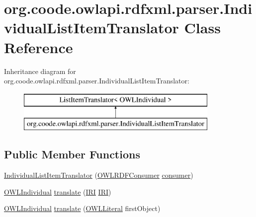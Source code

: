 \hypertarget{classorg_1_1coode_1_1owlapi_1_1rdfxml_1_1parser_1_1_individual_list_item_translator}{\section{org.\-coode.\-owlapi.\-rdfxml.\-parser.\-Individual\-List\-Item\-Translator Class Reference}
\label{classorg_1_1coode_1_1owlapi_1_1rdfxml_1_1parser_1_1_individual_list_item_translator}
}
Inheritance diagram for org.\-coode.\-owlapi.\-rdfxml.\-parser.\-Individual\-List\-Item\-Translator\-:\begin{figure}[H]
\begin{center}
\leavevmode
\includegraphics[height=2.000000cm]{classorg_1_1coode_1_1owlapi_1_1rdfxml_1_1parser_1_1_individual_list_item_translator}
\end{center}
\end{figure}
\subsection*{Public Member Functions}
\begin{DoxyCompactItemize}
\item 
\hyperlink{classorg_1_1coode_1_1owlapi_1_1rdfxml_1_1parser_1_1_individual_list_item_translator_a37862f63c3f3bcdc993577dc87b972ad}{Individual\-List\-Item\-Translator} (\hyperlink{classorg_1_1coode_1_1owlapi_1_1rdfxml_1_1parser_1_1_o_w_l_r_d_f_consumer}{O\-W\-L\-R\-D\-F\-Consumer} \hyperlink{classorg_1_1coode_1_1owlapi_1_1rdfxml_1_1parser_1_1_individual_list_item_translator_acf6dac9a268d5106743e43ea36cbccaf}{consumer})
\item 
\hyperlink{interfaceorg_1_1semanticweb_1_1owlapi_1_1model_1_1_o_w_l_individual}{O\-W\-L\-Individual} \hyperlink{classorg_1_1coode_1_1owlapi_1_1rdfxml_1_1parser_1_1_individual_list_item_translator_a884402b94b8cb590bea423339d1ff8cb}{translate} (\hyperlink{classorg_1_1semanticweb_1_1owlapi_1_1model_1_1_i_r_i}{I\-R\-I} \hyperlink{classorg_1_1semanticweb_1_1owlapi_1_1model_1_1_i_r_i}{I\-R\-I})
\item 
\hyperlink{interfaceorg_1_1semanticweb_1_1owlapi_1_1model_1_1_o_w_l_individual}{O\-W\-L\-Individual} \hyperlink{classorg_1_1coode_1_1owlapi_1_1rdfxml_1_1parser_1_1_individual_list_item_translator_a1af1d1aee564d41b37c592c118844564}{translate} (\hyperlink{interfaceorg_1_1semanticweb_1_1owlapi_1_1model_1_1_o_w_l_literal}{O\-W\-L\-Literal} first\-Object)
\end{DoxyCompactItemize}
